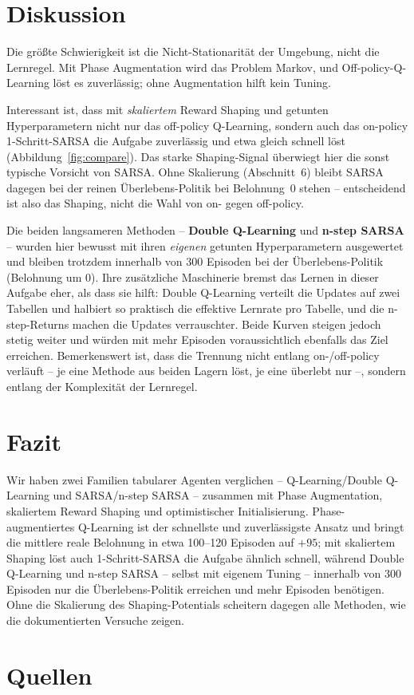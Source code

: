 \documentclass[11pt,a4paper]{article}
\begin{document}
\section{Diskussion}
Die gr\"o\ss te Schwierigkeit ist die Nicht-Stationarit\"at der Umgebung, nicht die
Lernregel. Mit Phase Augmentation wird das Problem Markov, und Off-policy-Q-Learning
l\"ost es zuverl\"assig; ohne Augmentation hilft kein Tuning.

Interessant ist, dass mit \emph{skaliertem} Reward Shaping und getunten Hyperparametern
nicht nur das off-policy Q-Learning, sondern auch das on-policy \mbox{1-Schritt-SARSA}
die Aufgabe zuverl\"assig und etwa gleich schnell l\"ost (Abbildung~\ref{fig:compare}).
Das starke Shaping-Signal \"uberwiegt hier die sonst typische Vorsicht von SARSA. Ohne
Skalierung (Abschnitt~6) bleibt SARSA dagegen bei der reinen \glqq \"Uberlebens\grqq-Politik
bei Belohnung~$0$ stehen -- entscheidend ist also das Shaping, nicht die Wahl von on-
gegen off-policy.

Die beiden langsameren Methoden -- \textbf{Double Q-Learning} und \textbf{n-step SARSA}
-- wurden hier bewusst mit ihren \emph{eigenen} getunten Hyperparametern ausgewertet und
bleiben trotzdem innerhalb von 300 Episoden bei der \"Uberlebens-Politik (Belohnung um
$0$). Ihre zus\"atzliche Maschinerie bremst das Lernen in dieser Aufgabe eher, als dass
sie hilft: Double Q-Learning verteilt die Updates auf zwei Tabellen und halbiert so
praktisch die effektive Lernrate pro Tabelle, und die n-step-Returns machen die Updates
verrauschter. Beide Kurven steigen jedoch stetig weiter und w\"urden mit mehr Episoden
voraussichtlich ebenfalls das Ziel erreichen. Bemerkenswert ist, dass die Trennung nicht
entlang on-/off-policy verl\"auft -- je eine Methode aus beiden Lagern l\"ost, je eine
\"uberlebt nur --, sondern entlang der Komplexit\"at der Lernregel.

\section{Fazit}
Wir haben zwei Familien tabularer Agenten verglichen -- Q-Learning/Double Q-Learning
und SARSA/n-step SARSA -- zusammen mit Phase Augmentation, skaliertem Reward Shaping und
optimistischer Initialisierung. Phase-augmentiertes Q-Learning ist der schnellste und
zuverl\"assigste Ansatz und bringt die mittlere reale Belohnung in etwa 100--120 Episoden
auf $+95$; mit skaliertem Shaping l\"ost auch 1-Schritt-SARSA die Aufgabe \"ahnlich
schnell, w\"ahrend Double Q-Learning und n-step SARSA -- selbst mit eigenem Tuning --
innerhalb von 300 Episoden nur die \"Uberlebens-Politik erreichen und mehr Episoden
ben\"otigen. Ohne die Skalierung des Shaping-Potentials scheitern dagegen alle Methoden,
wie die dokumentierten Versuche zeigen.

\newpage
\section{Quellen}
\nocite{*}
\printbibliography
\end{document}
